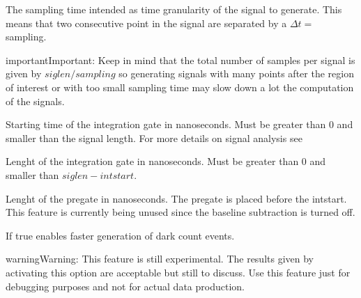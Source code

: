 \documentclass[letterpaper,10pt,english]{sphinxmanual}
\begin{document}
\begin{fulllineitems}
The sampling time intended as time granularity of the signal to generate. This means that two consecutive point in the signal are separated by a \(\Delta t=\) sampling.

\begin{sphinxadmonition}{important}{Important:}
Keep in mind that the total number of samples per signal is given by \(siglen/sampling\) so generating signals with many points after the region of interest or with too small sampling time may slow down a lot the computation of the signals.
\end{sphinxadmonition}

\end{fulllineitems}



\begin{fulllineitems}
Starting time of the integration gate in nanoseconds. Must be greater than 0 and smaller than the signal length. For more details on signal analysis see {\hyperref[\detokenize{theory:signalanalysistheory}]{}}

\end{fulllineitems}



\begin{fulllineitems}
Lenght of the integration gate in nanoseconds. Must be greater than 0 and smaller than \(siglen - intstart\).

\end{fulllineitems}



\begin{fulllineitems}
Lenght of the pregate in nanoseconds. The pregate is placed before the intstart. This feature is currently being unused since the baseline subtraction is turned off.

\end{fulllineitems}



\begin{fulllineitems}
If true enables faster generation of dark count events.

\begin{sphinxadmonition}{warning}{Warning:}
This feature is still experimental. The results given by activating this option are acceptable but still to discuss.
Use this feature just for debugging purposes and not for actual data production.
\end{sphinxadmonition}

\end{fulllineitems}
\end{document}
